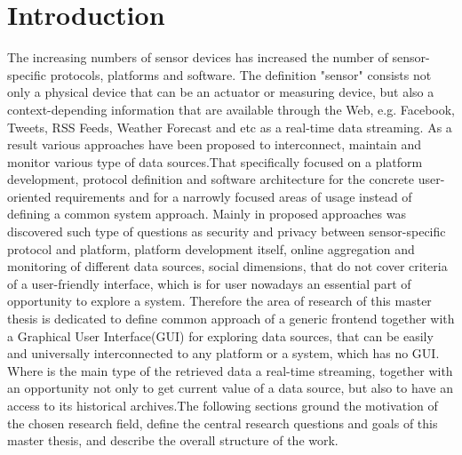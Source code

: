 
\chapter{Introduction}

  \begin{singlespace}
     The increasing numbers of sensor devices has increased the number of sensor-specific protocols, platforms and software. The definition "sensor" consists not only a physical device that can be an actuator or measuring device, but also a context-depending information that are available through the Web, e.g. Facebook, Tweets, RSS Feeds, Weather Forecast and etc as a real-time data streaming. As a result various approaches have been proposed to interconnect, maintain and monitor various type of data sources\cite{6588063,bendel2013service,song2010real}.That specifically focused on a platform development, protocol definition and software architecture for the concrete user-oriented requirements and for a narrowly focused areas of usage instead of defining a common system approach. Mainly in proposed approaches was discovered such type of questions as security and privacy between sensor-specific protocol and platform, platform development itself, online aggregation and monitoring of different data sources, social dimensions\cite{eggert2013sensorcloud}, that do not cover criteria of a user-friendly interface, which is for user nowadays an essential part of opportunity to explore a system. Therefore the area of research of this master thesis is dedicated to define common approach of a generic frontend together with a Graphical User Interface(GUI) for exploring data sources, that can be easily and universally interconnected to any platform or a system, which has no GUI. Where is the main type of the retrieved data a real-time streaming, together with an opportunity not only to get current value of a data source, but also to have an access to its historical archives.The following sections ground the motivation of the chosen research field, define the central research questions and goals of this master thesis, and describe the overall structure of the work.
  \end{singlespace}

